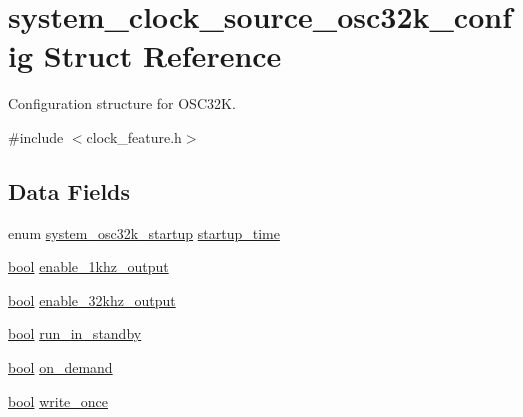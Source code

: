 \hypertarget{structsystem__clock__source__osc32k__config}{}\section{system\+\_\+clock\+\_\+source\+\_\+osc32k\+\_\+config Struct Reference}
\label{structsystem__clock__source__osc32k__config}


Configuration structure for O\+S\+C32K.  




{\ttfamily \#include $<$clock\+\_\+feature.\+h$>$}

\subsection*{Data Fields}
\begin{DoxyCompactItemize}
\item 
enum \mbox{\hyperlink{group__asfdoc__sam0__system__clock__group_gaf2f527fc5dd85dcf1c7091d6059d05cb}{system\+\_\+osc32k\+\_\+startup}} \mbox{\hyperlink{structsystem__clock__source__osc32k__config_ac9cd8bea608992ed4f1be68325aa5f2d}{startup\+\_\+time}}
\item 
\mbox{\hyperlink{group__group__sam0__utils_ga97a80ca1602ebf2303258971a2c938e2}{bool}} \mbox{\hyperlink{structsystem__clock__source__osc32k__config_a1b19b8025cbbd0e1c0760a1fe845d084}{enable\+\_\+1khz\+\_\+output}}
\item 
\mbox{\hyperlink{group__group__sam0__utils_ga97a80ca1602ebf2303258971a2c938e2}{bool}} \mbox{\hyperlink{structsystem__clock__source__osc32k__config_a904f4432fc52ffd6d0ec7ac0f4f8f461}{enable\+\_\+32khz\+\_\+output}}
\item 
\mbox{\hyperlink{group__group__sam0__utils_ga97a80ca1602ebf2303258971a2c938e2}{bool}} \mbox{\hyperlink{structsystem__clock__source__osc32k__config_a514964d5c2a8da4dd96bac82a53477f2}{run\+\_\+in\+\_\+standby}}
\item 
\mbox{\hyperlink{group__group__sam0__utils_ga97a80ca1602ebf2303258971a2c938e2}{bool}} \mbox{\hyperlink{structsystem__clock__source__osc32k__config_a23620c12634b9230d2325ec5c245cf32}{on\+\_\+demand}}
\item 
\mbox{\hyperlink{group__group__sam0__utils_ga97a80ca1602ebf2303258971a2c938e2}{bool}} \mbox{\hyperlink{structsystem__clock__source__osc32k__config_a9caf694235ca3f471e8167a317b6f581}{write\+\_\+once}}
\end{DoxyCompactItemize}


